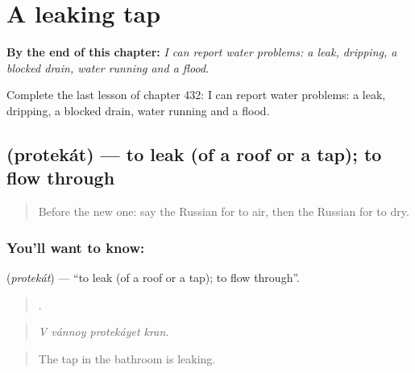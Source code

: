 
\chapter{A leaking tap}
\label{ch:ru-a-leaking-tap}

\begin{chapteropening}
\textbf{By the end of this chapter:} \emph{I can report water problems: a leak, dripping, a blocked drain, water running and a flood.}

Complete the last lesson of chapter 432: I can report water problems: a leak, dripping, a blocked drain, water running and a flood.
\end{chapteropening}

\section[\texorpdfstring{\ru{протекать} (protekát)}{протекать (protekát)}]{ (protekát) — to leak (of a roof or a tap); to flow through}

\label{lesson:RU-C432-protekat}



\begin{quote}
Before the new one: say the Russian for to air, then the Russian for to dry.
\end{quote}

\subsection*{You'll want to know: }
\textbf{} (\emph{protekát}) — \textquotedblleft{}to leak (of a roof or a tap); to flow through\textquotedblright{}.

\begin{quote}
   .
\end{quote}

\begin{quote}
\emph{V vánnoy protekáyet kran.}
\end{quote}

\begin{quote}
The tap in the bathroom is leaking.
\end{quote}

